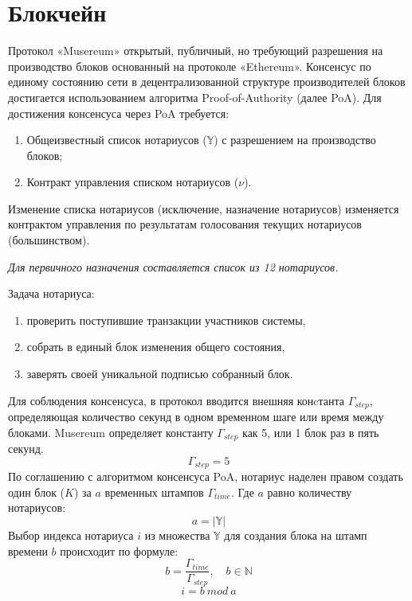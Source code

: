 \documentclass[12pt]{report}
\begin{document}
\section{Блокчейн}
\label{tech-blockchain}
\begin{multicols}{2}
Протокол «Musereum» открытый, публичный, но требующий разрешения на производство блоков основанный на протоколе «Ethereum». Консенсус по единому состоянию сети в децентрализованной структуре производителей блоков достигается использованием алгоритма Proof-of-Authority (далее PoA). Для достижения консенсуса через PoA требуется:
\begin{enumerate}
\item Общеизвестный список нотариусов ($\mathbb{Y}$) с разрешением на производство блоков;
\item Контракт управления списком нотариусов ($\nu$).
\end{enumerate}
Изменение списка нотариусов (исключение, назначение нотариусов) изменяется контрактом управления по результатам голосования текущих нотариусов (большинством). 

\textit{Для первичного назначения составляется список из 12 нотариусов.}

Задача нотариуса: 
\begin{enumerate}
\item проверить поступившие транзакции участников системы,
\item собрать в единый блок изменения общего состояния,
\item заверять своей уникальной подписью собранный блок.
\end{enumerate}
Для соблюдения консенсуса, в протокол вводится внешняя конcтанта $\Gamma_{step}$, определяющая количество секунд в одном временном шаге или время между блоками. Musereum определяет константу $\Gamma_{step}$ как 5, или 1 блок раз в пять секунд.
\begin{equation}
\Gamma_{step} = 5
\end{equation}
По соглашению с алгоритмом консенсуса PoA, нотариус наделен правом создать один блок ($K$) за $a$ временных штампов $\Gamma_{time}$. Где $a$ равно количеству нотариусов:
\begin{equation}
a = |\mathbb{Y}|
\end{equation}
Выбор индекса нотариуса $i$ из множества $\mathbb{Y}$ для создания блока на штамп времени $b$ происходит по формуле: 
\begin{equation}
b = \frac{\Gamma_{time}}{\Gamma_{step}},  \quad b \in \mathbb{N} 
\end{equation}
\begin{equation}
i = b \ mod \ a
\end{equation}
\end{multicols}
\end{document}
